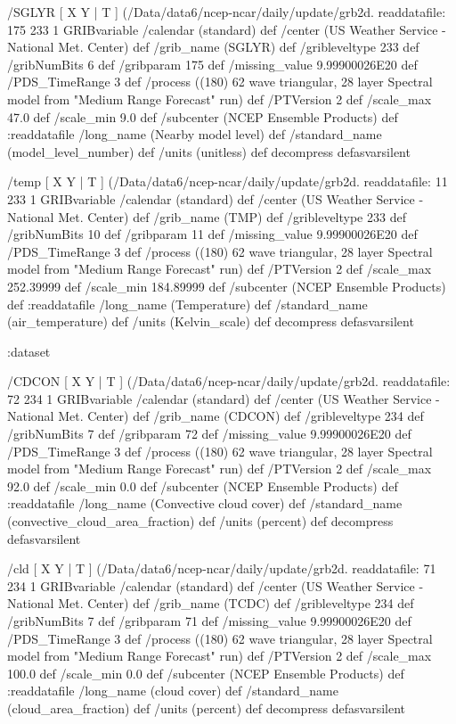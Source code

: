 \begin{ingrid}
   /SGLYR { [ X Y | T ] (/Data/data6/ncep-ncar/daily/update/grb2d.%
   readdatafile:
   175 233 1 GRIBvariable
   /calendar (standard) def
   /center (US Weather Service - National Met. Center) def
   /grib_name (SGLYR) def
   /gribleveltype 233 def
   /gribNumBits 6 def
   /gribparam 175 def
   /missing_value 9.99900026E20 def
   /PDS_TimeRange 3 def
   /process ((180) 62 wave triangular, 28 layer Spectral model from "Medium Range Forecast" run) def
   /PTVersion 2 def
   /scale_max 47.0 def
   /scale_min 9.0 def
   /subcenter (NCEP Ensemble Products) def
   :readdatafile
   /long_name (Nearby model level) def
   /standard_name (model_level_number) def
   /units (unitless) def
   decompress
   } defasvarsilent

   /temp { [ X Y | T ] (/Data/data6/ncep-ncar/daily/update/grb2d.%
   readdatafile:
   11 233 1 GRIBvariable
   /calendar (standard) def
   /center (US Weather Service - National Met. Center) def
   /grib_name (TMP) def
   /gribleveltype 233 def
   /gribNumBits 10 def
   /gribparam 11 def
   /missing_value 9.99900026E20 def
   /PDS_TimeRange 3 def
   /process ((180) 62 wave triangular, 28 layer Spectral model from "Medium Range Forecast" run) def
   /PTVersion 2 def
   /scale_max 252.39999 def
   /scale_min 184.89999 def
   /subcenter (NCEP Ensemble Products) def
   :readdatafile
   /long_name (Temperature) def
   /standard_name (air_temperature) def
   /units (Kelvin_scale) def
   decompress
   } defasvarsilent

  :dataset

  /CDCON { [ X Y | T ] (/Data/data6/ncep-ncar/daily/update/grb2d.%
  readdatafile:
  72 234 1 GRIBvariable
  /calendar (standard) def
  /center (US Weather Service - National Met. Center) def
  /grib_name (CDCON) def
  /gribleveltype 234 def
  /gribNumBits 7 def
  /gribparam 72 def
  /missing_value 9.99900026E20 def
  /PDS_TimeRange 3 def
  /process ((180) 62 wave triangular, 28 layer Spectral model from "Medium Range Forecast" run) def
  /PTVersion 2 def
  /scale_max 92.0 def
  /scale_min 0.0 def
  /subcenter (NCEP Ensemble Products) def
  :readdatafile
  /long_name (Convective cloud cover) def
  /standard_name (convective_cloud_area_fraction) def
  /units (percent) def
  decompress
  } defasvarsilent

  /cld { [ X Y | T ] (/Data/data6/ncep-ncar/daily/update/grb2d.%
  readdatafile:
  71 234 1 GRIBvariable
  /calendar (standard) def
  /center (US Weather Service - National Met. Center) def
  /grib_name (TCDC) def
  /gribleveltype 234 def
  /gribNumBits 7 def
  /gribparam 71 def
  /missing_value 9.99900026E20 def
  /PDS_TimeRange 3 def
  /process ((180) 62 wave triangular, 28 layer Spectral model from "Medium Range Forecast" run) def
  /PTVersion 2 def
  /scale_max 100.0 def
  /scale_min 0.0 def
  /subcenter (NCEP Ensemble Products) def
  :readdatafile
  /long_name (cloud cover) def
  /standard_name (cloud_area_fraction) def
  /units (percent) def
  decompress
  } defasvarsilent


\end{ingrid}
